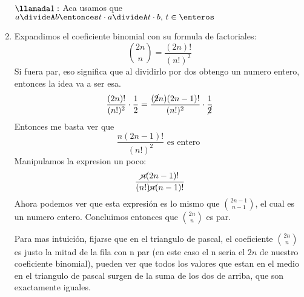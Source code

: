 \begin{enumerate}[label=\alph*)]
                $\llamada1 :$ Aca usamos que $a\divideA b \entonces t\cdot a \divideA t \cdot b,\, t \in \enteros$
        \item
                Expandimos el coeficiente binomial con su formula de factoriales:
                \[\binom{2n}{n} = \frac{(2n)!}{(n!)^2}\]
                Si fuera par, eso significa que al dividirlo por dos obtengo un numero entero, entonces la idea va a ser esa.
                \[\frac{(2n)!}{(n!)^2} \cdot \frac{1}{2} = \frac{(\cancel{2}n)(2n-1)!}{(n!)^2} \cdot \frac{1}{\cancel{2}}\]
                Entonces me basta ver que
                \[\frac{n(2n-1)!}{(n!)^2} \text{ es entero }\]
                Manipulamos la expresion un poco:
                \[\frac{\cancel{n}(2n-1)!}{(n!)\cancel{n}(n-1)!}\]
                Ahora podemos ver que esta expresión es lo mismo que $\binom{2n-1}{n-1}$, el cual es un numero entero. Concluimos
                entonces que $\binom{2n}{n}$ es par. \par   
                Para mas intuición, fijarse que en el triangulo de pascal, el coeficiente $\binom{2n}{n}$ es justo la mitad de la fila
                con n par (en este caso el n seria el $2n$ de nuestro coeficiente binomial), pueden ver que todos los valores que estan en el medio
                en el triangulo de pascal surgen de la suma de los dos de arriba, que son exactamente iguales.

\end{enumerate}

\begin{aportes}
        \item {}
\end{aportes}
